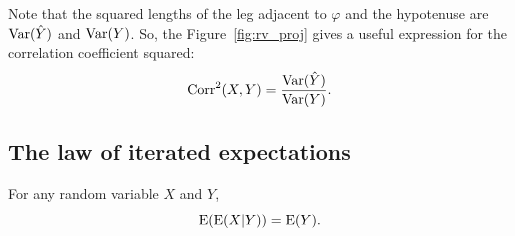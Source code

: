 Note that the squared lengths of the leg adjacent to $\varphi$ and the
hypotenuse are $\operatorname{Var}(\hat Y)$ and $\operatorname{Var}(Y)$.
So, the Figure~\ref{fig:rv_proj} gives a useful expression for the correlation
coefficient squared:
\[
\operatorname{Corr}^2(X,Y) = \frac{\operatorname{Var}(\hat Y)}{\operatorname{Var}(Y)}.
\]

\subsection{The law of iterated expectations}


\begin{theorem}
For any random variable $X$ and $Y$,
\[
\operatorname{E}(\operatorname{E}(X|Y)) = \operatorname{E}(Y).
\]
\end{theorem}

